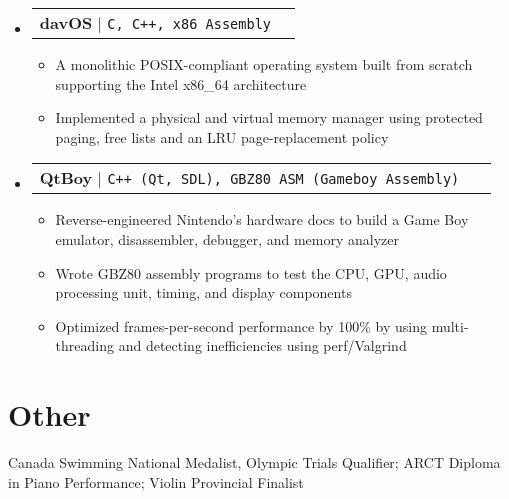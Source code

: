 \documentclass[letterpaper,10pt]{article}
\makeatletter
\newcommand{\resumeItem}[1]{
  \item\small{
    {#1 \vspace{-2pt}}
  }
}
\newcommand{\resumeProjectHeading}[2]{
    \item
    \begin{tabular*}{0.97\textwidth}{l@{\extracolsep{\fill}}r}
      \small#1 & #2 \\
    \end{tabular*}\vspace{-7pt}
}
\newcommand{\resumeSubHeadingListStart}{\begin{itemize}[leftmargin=0.15in, label={}]}
\newcommand{\resumeSubHeadingListEnd}{\end{itemize}}
\newcommand{\resumeItemListStart}{\begin{itemize}}
\newcommand{\resumeItemListEnd}{\end{itemize}\vspace{-5pt}}
\makeatother
\begin{document}
    \resumeSubHeadingListStart
      \resumeProjectHeading
          {\textbf{davOS}
            \href{https://github.com/davidtranhq/davOS}{\faicon{github}}
            $|$ \texttt{C, C++, x86 Assembly}
          }{}
          \resumeItemListStart
            \resumeItem{ A monolithic POSIX-compliant operating system built from scratch supporting the Intel x86\_64 architecture}
            \resumeItem{ Implemented a physical and virtual memory manager using protected paging, free lists and an LRU page-replacement policy }
          \resumeItemListEnd
      \resumeProjectHeading
          {\textbf{QtBoy}
            \href{https://github.com/davidtranhq/qtboy}{\faicon{github}}
            $|$ \texttt{C++ (Qt, SDL), GBZ80 ASM (Gameboy Assembly) } 
          }{}
          \resumeItemListStart
            \resumeItem{ Reverse-engineered Nintendo's hardware docs to build a Game Boy emulator, disassembler, debugger, and memory analyzer}
            \resumeItem{ Wrote GBZ80 assembly programs to test the CPU, GPU, audio processing unit, timing, and display components}
            \resumeItem{ Optimized frames-per-second performance by 100\% by using multi-threading and detecting inefficiencies using perf/Valgrind }
          \resumeItemListEnd
  
        

    \resumeSubHeadingListEnd


\section{Other}
\begin{itemize}[leftmargin=0.15in, label={}]
   \small{\item{
    {Canada Swimming National Medalist, Olympic Trials Qualifier; ARCT Diploma in Piano Performance}; Violin Provincial Finalist}}
\end{itemize}
\end{document}
